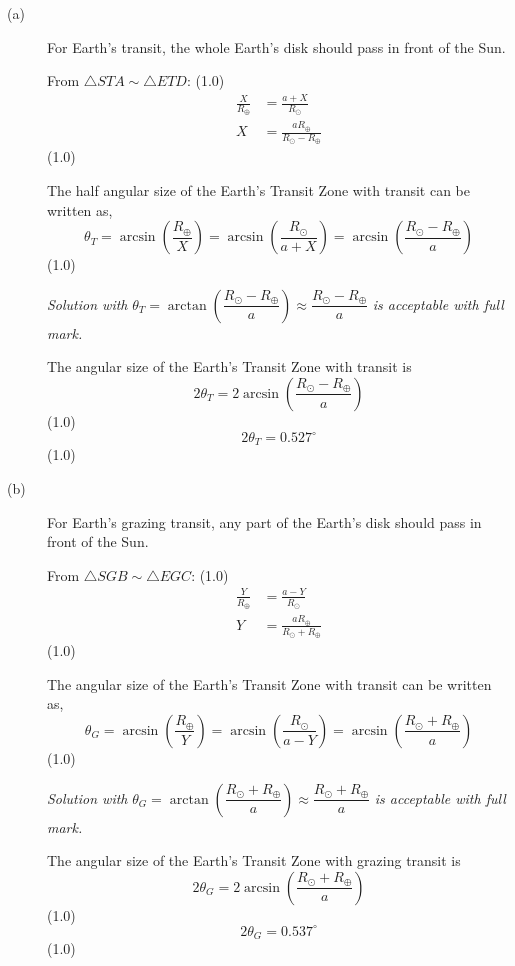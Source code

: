 \begin{description}
\item[(a)] For Earth's transit, the whole Earth's disk should pass in front of
the Sun.

From $\triangle STA \sim \triangle ETD$: \hfill(1.0)
\begin{align*}
\frac{X}{R_\oplus} &= \frac{a+X}{R_\odot}\\
X &= \frac{aR_\oplus}{R_\odot - R_\oplus}
\end{align*}
\hfill(1.0)

The half angular size of the Earth's Transit Zone with transit can be written
as,
\[ \theta_T = \arcsin\!\left(\frac{R_\oplus}{X}\right)
            = \arcsin\!\left(\frac{R_\odot}{a+X}\right)
            = \arcsin\!\left(\frac{R_\odot - R_\oplus}{a}\right) \]
\hfill(1.0)

\textit{Solution with}
$\theta_T = \arctan\!\left(\dfrac{R_\odot - R_\oplus}{a}\right)
 \approx \dfrac{R_\odot - R_\oplus}{a}$
\textit{is acceptable with full mark.}

The angular size of the Earth's Transit Zone with transit is
\[ 2\theta_T = 2\arcsin\!\left(\frac{R_\odot - R_\oplus}{a}\right) \]
\hfill(1.0)
\[ 2\theta_T = 0.527^\circ \]
\hfill(1.0)

\item[(b)] For Earth's grazing transit, any part of the Earth's disk should
pass in front of the Sun.

From $\triangle SGB \sim \triangle EGC$: \hfill(1.0)
\begin{align*}
\frac{Y}{R_\oplus} &= \frac{a-Y}{R_\odot}\\
Y &= \frac{aR_\oplus}{R_\odot + R_\oplus}
\end{align*}
\hfill(1.0)

The angular size of the Earth's Transit Zone with transit can be written as,
\[ \theta_G = \arcsin\!\left(\frac{R_\oplus}{Y}\right)
            = \arcsin\!\left(\frac{R_\odot}{a-Y}\right)
            = \arcsin\!\left(\frac{R_\odot + R_\oplus}{a}\right) \]
\hfill(1.0)

\textit{Solution with}
$\theta_G = \arctan\!\left(\dfrac{R_\odot + R_\oplus}{a}\right)
 \approx \dfrac{R_\odot + R_\oplus}{a}$
\textit{is acceptable with full mark.}

The angular size of the Earth's Transit Zone with grazing transit is
\[ 2\theta_G = 2\arcsin\!\left(\frac{R_\odot + R_\oplus}{a}\right) \]
\hfill(1.0)
\[ 2\theta_G = 0.537^\circ \]
\hfill(1.0)
\end{description}

